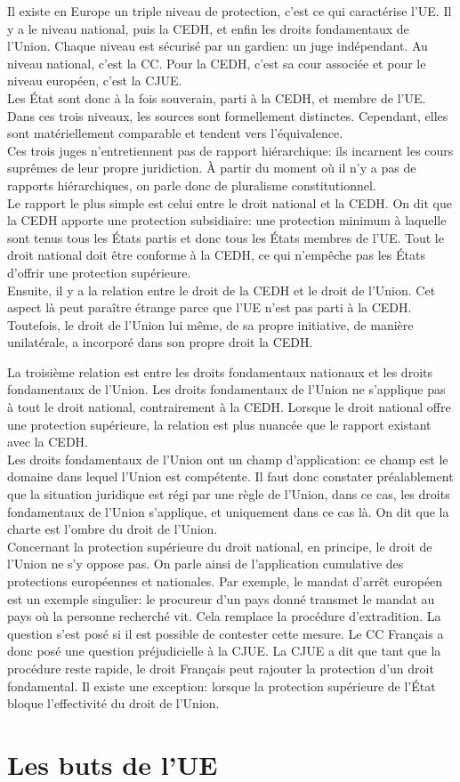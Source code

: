 \documentclass[12pt, a4paper, openany]{book}
\begin{document}
Il existe en Europe un triple niveau de protection, c'est ce qui caractérise l'UE. Il y a le niveau national, puis la CEDH, et enfin les droits fondamentaux de l'Union. Chaque niveau est sécurisé par un gardien: un juge indépendant. Au niveau national, c'est la CC. Pour la CEDH, c'est sa cour associée et pour le niveau européen, c'est la CJUE. \\
Les État sont donc à la fois souverain, parti à la CEDH, et membre de l'UE. \\
Dans ces trois niveaux, les sources sont formellement distinctes. Cependant, elles sont matériellement comparable et tendent vers l'équivalence. \\
Ces trois juges n'entretiennent pas de rapport hiérarchique: ils incarnent les cours suprêmes de leur propre juridiction. À partir du moment où il n'y a pas de rapports hiérarchiques, on parle donc de pluralisme constitutionnel. \\
Le rapport le plus simple est celui entre le droit national et la CEDH. On dit que la CEDH apporte une protection subsidiaire: une protection minimum à laquelle sont tenus tous les États partis et donc tous les États membres de l'UE. Tout le droit national doit être conforme à la CEDH, ce qui n'empêche pas les États d'offrir une protection supérieure. \\
Ensuite, il y a la relation entre le droit de la CEDH et le droit de l'Union. Cet aspect là peut paraître étrange parce que l'UE n'est pas parti à la CEDH. Toutefois, le droit de l'Union lui même, de sa propre initiative, de manière unilatérale, a incorporé dans son propre droit la CEDH.


La troisième relation est entre les droits fondamentaux nationaux et les droits fondamentaux de l'Union. Les droits fondamentaux de l'Union ne s'applique pas à tout le droit national, contrairement à la CEDH. Lorsque le droit national offre une protection supérieure, la relation est plus nuancée que le rapport existant avec la CEDH. \\ 
Les droits fondamentaux de l'Union ont un champ d'application: ce champ est le domaine dans lequel l'Union est compétente. Il faut donc constater préalablement que la situation juridique est régi par une règle de l'Union, dans ce cas, les droits fondamentaux de l'Union s'applique, et uniquement dans ce cas là. On dit que la charte est l'ombre du droit de l'Union. \\
Concernant la protection supérieure du droit national, en principe, le droit de l'Union ne s'y oppose pas. On parle ainsi de l'application cumulative des protections européennes et nationales. Par exemple, le mandat d'arrêt européen est un exemple singulier: le procureur d'un pays donné transmet le mandat au pays où la personne recherché vit. Cela remplace la procédure d'extradition. La question s'est posé si il est possible de contester cette mesure. Le CC Français a donc posé une question préjudicielle à la CJUE. La CJUE a dit que tant que la procédure reste rapide, le droit Français peut rajouter la protection d'un droit fondamental. Il existe une exception: lorsque la protection supérieure de l'État bloque l'effectivité du droit de l'Union.




\chapter{Les buts de l'UE}
\end{document}
